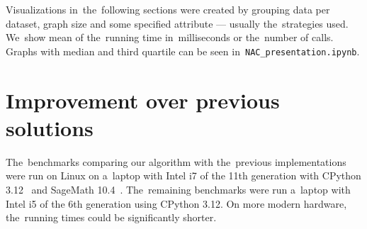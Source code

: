 Visualizations in~the~following sections were created by grouping data per dataset,
graph size and some specified attribute --- usually the~strategies used.
%
We~show mean of the~running time in~milliseconds or
the~number of \IsNACColoring{} calls.
%
Graphs with median and third quartile can be seen in~\texttt{NAC\_presentation.ipynb}.


\section{Improvement over previous solutions}

The~benchmarks comparing our algorithm with the~previous implementations
were run on Linux on a~laptop with Intel i7 of the 11th generation
with CPython 3.12~\cite{cpython} and SageMath 10.4~\cite{sagemath}.
The~remaining benchmarks were run a~laptop with Intel i5 of the 6th generation
using CPython 3.12.
On more modern hardware, the~running times could be significantly shorter.

